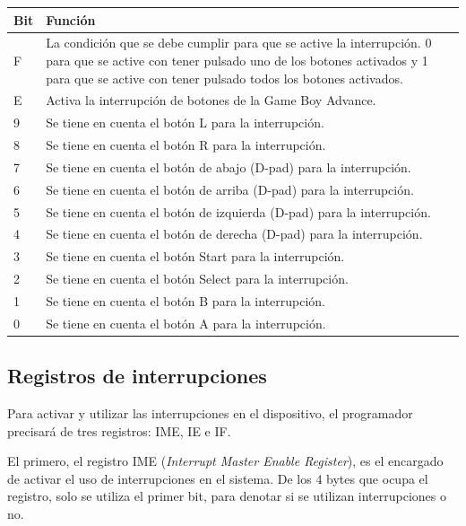 {	\begin{longtable}[h]
		\centering
		\begin{tabular}{| l | p{5cm} |}
			\hline
			\textbf{Bit} & \textbf{Función} \\ \hline
			F &  La condición que se debe cumplir para que se active la interrupción. 0 para que se active con tener pulsado uno de los botones activados y 1 para que se active con tener pulsado todos los botones activados. \\ \hline
			E &  Activa la interrupción de botones de la Game Boy Advance. \\ \hline
			9 &  Se tiene en cuenta el botón L para la interrupción. \\ \hline
			8 &  Se tiene en cuenta el botón R para la interrupción. \\ \hline
			7 &  Se tiene en cuenta el botón de abajo (D-pad) para la interrupción. \\ \hline
			6 &  Se tiene en cuenta el botón de arriba (D-pad) para la interrupción. \\ \hline
			5 &  Se tiene en cuenta el botón de izquierda (D-pad) para la interrupción. \\ \hline
			4 &  Se tiene en cuenta el botón de derecha (D-pad) para la interrupción. \\ \hline
			3 &  Se tiene en cuenta el botón Start para la interrupción. \\ \hline
			2 &  Se tiene en cuenta el botón Select para la interrupción. \\ \hline
			1 &  Se tiene en cuenta el botón B para la interrupción. \\ \hline
			0 &  Se tiene en cuenta el botón A para la interrupción. \\ \hline
		\end{tabular}
		\caption{Los botones en el registro KEYCNT.}\label{tab:keypad_irq_reg}
	\end{longtable}
	\FloatBarrier{}

\subsection{Registros de interrupciones}
Para activar y utilizar las interrupciones en el dispositivo, el programador precisará de tres registros: IME, IE e IF.

El primero, el registro IME (\textit{Interrupt Master Enable Register}), es el encargado de activar el uso de interrupciones en el sistema. De los 4 bytes que ocupa el registro, solo se utiliza el primer bit, para denotar si se utilizan interrupciones o no.

}
